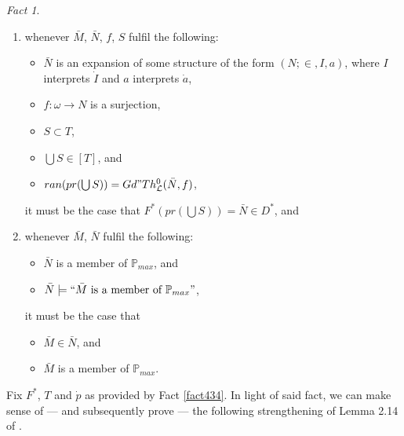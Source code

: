\documentclass[12pt, twoside]{memoir}
\numberwithin{equation}{section}
\theoremstyle{definition}
\theoremstyle{remark}
\newtheorem{fact}[thm]{Fact}
\theoremstyle{definition}
\theoremstyle{definition}
\theoremstyle{definition}
\theoremstyle{remark}
\begin{document}
\begin{fact}
\begin{enumerate}[label=(4.34.\arabic*), leftmargin=50pt]
    \item\label{4346b} whenever $\bar{M}$, $\bar{N}$, $f$, $S$ fulfil the following:
    \begin{itemize}
        \item $\bar{N}$ is an expansion of some structure of the form $(N; \in, I, a)$, where $I$ interprets $\dot{I}$ and $a$ interprets $\dot{a}$,
        \item $f : \omega \longrightarrow N$ is a surjection,
        \item $S \subset T$,
        \item $\bigcup S \in [T]$, and
        \item $ran(pr(\bigcup S)) = Gd" Th^0_{\mathcal{L}}(\bar{N}, f)$,
    \end{itemize}
    it must be the case that $F^*(pr(\bigcup S)) = \bar{N} \in D^*$, and
    \item\label{4346} whenever $\bar{M}$, $\bar{N}$ fulfil the following:
    \begin{itemize}
        \item $\bar{N}$ is a member of $\mathbb{P}_{max}$, and
        \item $\bar{N} \models ``\bar{M} \text{ is a member of } \mathbb{P}_{max}"$,
    \end{itemize}
    it must be the case that
    \begin{itemize}
        \item $\bar{M} \in \bar{N}$, and
        \item $\bar{M}$ is a member of $\mathbb{P}_{max}$.
    \end{itemize}
\end{enumerate}
\end{fact}

Fix $F^*$, $T$ and $\dot{p}$ as provided by Fact \ref{fact434}. In light of said fact, we can make sense of --- and subsequently prove --- the following strengthening of Lemma 2.14 of \cite{schindler}.
\end{document}
